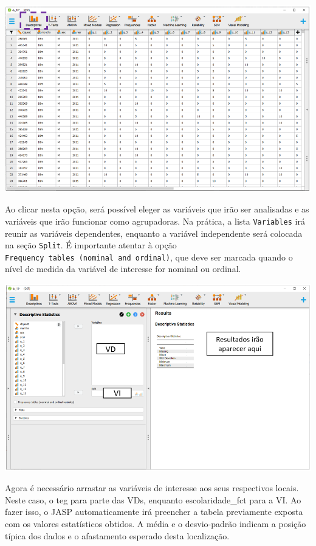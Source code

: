 \documentclass[
]{book}
\begin{document}
\includegraphics{./img/jasp_descriptives.png}

Ao clicar nesta opção, será possível eleger as variáveis que irão ser analisadas e as variáveis que irão funcionar como agrupadoras. Na prática, a lista \texttt{Variables} irá reunir as variáveis dependentes, enquanto a variável independente será colocada na seção \texttt{Split}. É importante atentar à opção \texttt{Frequency\ tables\ (nominal\ and\ ordinal)}, que deve ser marcada quando o nível de medida da variável de interesse for nominal ou ordinal.

\includegraphics{./img/jasp_descriptives2.png}

Agora é necessário arrastar as variáveis de interesse aos seus respectivos locais. Neste caso, o teg para parte das VDs, enquanto escolaridade\_fct para a VI. Ao fazer isso, o JASP automaticamente irá preencher a tabela previamente exposta com os valores estatísticos obtidos. A média e o desvio-padrão indicam a posição típica dos dados e o afastamento esperado desta localização.
\end{document}

